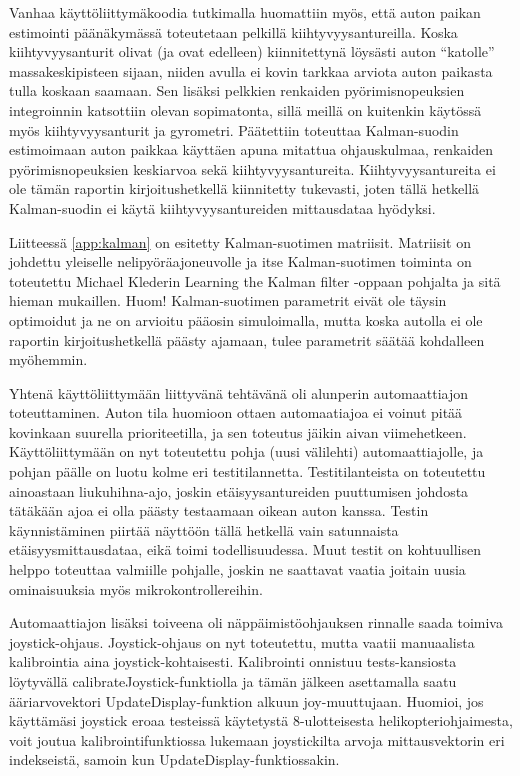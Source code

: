 \documentclass{article}
\begin{document}
Vanhaa käyttöliittymäkoodia tutkimalla huomattiin myös, että auton paikan estimointi päänäkymässä toteutetaan pelkillä kiihtyvyysantureilla. Koska kiihtyvyysanturit olivat (ja ovat edelleen) kiinnitettynä löysästi auton ``katolle'' massakeskipisteen sijaan, niiden avulla ei kovin tarkkaa arviota auton paikasta tulla koskaan saamaan. Sen lisäksi pelkkien renkaiden pyörimisnopeuksien integroinnin katsottiin olevan sopimatonta, sillä meillä on kuitenkin käytössä myös kiihtyvyysanturit ja gyrometri. Päätettiin toteuttaa Kalman-suodin estimoimaan auton paikkaa käyttäen apuna mitattua ohjauskulmaa, renkaiden pyörimisnopeuksien keskiarvoa sekä kiihtyvyysantureita. Kiihtyvyysantureita ei ole tämän raportin kirjoitushetkellä kiinnitetty tukevasti, joten tällä hetkellä Kalman-suodin ei käytä kiihtyvyysantureiden mittausdataa hyödyksi.

Liitteessä \ref{app:kalman} on esitetty Kalman-suotimen matriisit. Matriisit on johdettu yleiselle nelipyöräajoneuvolle ja itse Kalman-suotimen toiminta on toteutettu Michael Klederin Learning the Kalman filter \cite{bib:kalman} -oppaan pohjalta ja sitä hieman mukaillen. Huom! Kalman-suotimen parametrit eivät ole täysin optimoidut ja ne on arvioitu pääosin simuloimalla, mutta koska autolla ei ole raportin kirjoitushetkellä päästy ajamaan, tulee parametrit säätää kohdalleen myöhemmin.

Yhtenä käyttöliittymään liittyvänä tehtävänä oli alunperin automaattiajon toteuttaminen. Auton tila huomioon ottaen automaatiajoa ei voinut pitää kovinkaan suurella prioriteetilla, ja sen toteutus jäikin aivan viimehetkeen. Käyttöliittymään on nyt toteutettu pohja (uusi välilehti) automaattiajolle, ja pohjan päälle on luotu kolme eri testitilannetta. Testitilanteista on toteutettu ainoastaan liukuhihna-ajo, joskin etäisyysantureiden puuttumisen johdosta tätäkään ajoa ei olla päästy testaamaan oikean auton kanssa. Testin käynnistäminen piirtää näyttöön tällä hetkellä vain satunnaista etäisyysmittausdataa, eikä toimi todellisuudessa. Muut testit on kohtuullisen helppo toteuttaa valmiille pohjalle, joskin ne saattavat vaatia joitain uusia ominaisuuksia myös mikrokontrollereihin.

Automaattiajon lisäksi toiveena oli näppäimistöohjauksen rinnalle saada toimiva joystick-ohjaus. Joystick-ohjaus on nyt toteutettu, mutta vaatii manuaalista kalibrointia aina joystick-kohtaisesti. Kalibrointi onnistuu tests-kansiosta löytyvällä calibrateJoystick-funktiolla ja tämän jälkeen asettamalla saatu ääriarvovektori UpdateDisplay-funktion alkuun joy-muuttujaan. Huomioi, jos käyttämäsi joystick eroaa testeissä käytetystä 8-ulotteisesta helikopteriohjaimesta, voit joutua kalibrointifunktiossa lukemaan joystickilta arvoja mittausvektorin eri indekseistä, samoin kun UpdateDisplay-funktiossakin.
\end{document}
